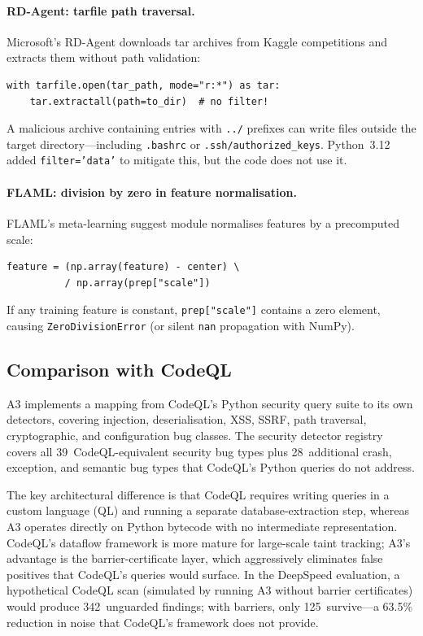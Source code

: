 \documentclass[sigconf,review,anonymous]{acmart}
\begin{document}
\paragraph{RD-Agent: tarfile path traversal.}
Microsoft's RD-Agent downloads tar archives from Kaggle competitions and extracts them without path validation:
\begin{lstlisting}
with tarfile.open(tar_path, mode="r:*") as tar:
    tar.extractall(path=to_dir)  # no filter!
\end{lstlisting}
A malicious archive containing entries with \texttt{../} prefixes can write files outside the target directory---including \texttt{.bashrc} or \texttt{.ssh/authorized\_keys}.
Python~3.12 added \texttt{filter='data'} to mitigate this, but the code does not use it.

\paragraph{FLAML: division by zero in feature normalisation.}
FLAML's meta-learning suggest module normalises features by a precomputed scale:
\begin{lstlisting}
feature = (np.array(feature) - center) \
          / np.array(prep["scale"])
\end{lstlisting}
If any training feature is constant, \texttt{prep["scale"]} contains a zero element, causing \texttt{ZeroDivisionError} (or silent \texttt{nan} propagation with NumPy).

\subsection{Comparison with CodeQL}

\textsc{A3} implements a mapping from CodeQL's Python security query suite to its own detectors, covering injection, deserialisation, XSS, SSRF, path traversal, cryptographic, and configuration bug classes.
The security detector registry covers all 39~CodeQL-equivalent security bug types plus 28~additional crash, exception, and semantic bug types that CodeQL's Python queries do not address.

The key architectural difference is that CodeQL requires writing queries in a custom language (QL) and running a separate database-extraction step, whereas \textsc{A3} operates directly on Python bytecode with no intermediate representation.
CodeQL's dataflow framework is more mature for large-scale taint tracking; \textsc{A3}'s advantage is the barrier-certificate layer, which aggressively eliminates false positives that CodeQL's queries would surface.
In the DeepSpeed evaluation, a hypothetical CodeQL scan (simulated by running \textsc{A3} without barrier certificates) would produce 342~unguarded findings; with barriers, only 125~survive---a 63.5\% reduction in noise that CodeQL's framework does not provide.
\end{document}
